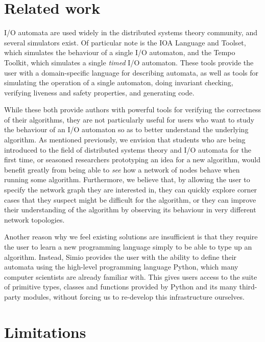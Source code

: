 \documentclass{scrartcl}
\begin{document}
\section{Related work}

I/O automata are used widely in the distributed systems theory community, and
several simulators exist. Of particular note is the IOA Language and
Toolset\cite{ioa}, which simulates the behaviour of a single I/O automaton, and
the Tempo Toolkit\cite{tempo}, which simulates a single \textit{timed} I/O
automaton. These tools provide the user with a domain-specific language for
describing automata, as well as tools for simulating the operation of a single
automaton, doing invariant checking, verifying liveness and safety properties,
and generating code.

While these both provide authors with powerful tools for verifying the
correctness of their algorithms, they are not particularly useful for users who
want to study the behaviour of an I/O automaton so as to better understand the
underlying algorithm. As mentioned previously, we envision that students who
are being introduced to the field of distributed systems theory and I/O
automata for the first time, or seasoned researchers prototyping an idea for a
new algorithm, would benefit greatly from being able to \textit{see} how a
network of nodes behave when running some algorithm. Furthermore, we believe
that, by allowing the user to specify the network graph they are interested in,
they can quickly explore corner cases that they suspect might be difficult for
the algorithm, or they can improve their understanding of the algorithm by
observing its behaviour in very different network topologies.

Another reason why we feel existing solutions are insufficient is that they
require the user to learn a new programming language simply to be able to type
up an algorithm. Instead, Simio provides the user with the ability to define
their automata using the high-level programming language Python, which many
computer scientists are already familiar with. This gives users access to the
suite of primitive types, classes and functions provided by Python and its many
third-party modules, without forcing us to re-develop this infrastructure
ourselves.

\section{Limitations}
\end{document}
